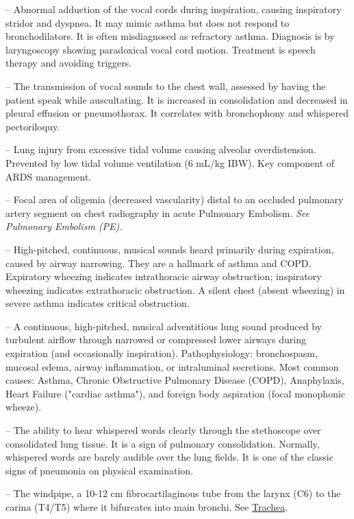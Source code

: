 -- Abnormal adduction of the vocal cords during inspiration, causing inspiratory stridor and dyspnea. It may mimic asthma but does not respond to bronchodilators. It is often misdiagnosed as refractory asthma. Diagnosis is by laryngoscopy showing paradoxical vocal cord motion. Treatment is speech therapy and avoiding triggers.

-- The transmission of vocal sounds to the chest wall, assessed by having the patient speak while auscultating. It is increased in consolidation and decreased in pleural effusion or pneumothorax. It correlates with bronchophony and whispered pectoriloquy.

-- Lung injury from excessive tidal volume causing alveolar overdistension. Prevented by low tidal volume ventilation (6 mL/kg IBW). Key component of ARDS management.

-- Focal area of oligemia (decreased vascularity) distal to an occluded pulmonary artery segment on chest radiography in acute Pulmonary Embolism. \textit{See Pulmonary Embolism (PE).}

-- High-pitched, continuous, musical sounds heard primarily during expiration, caused by airway narrowing. They are a hallmark of asthma and COPD. Expiratory wheezing indicates intrathoracic airway obstruction; inspiratory wheezing indicates extrathoracic obstruction. A silent chest (absent wheezing) in severe asthma indicates critical obstruction.

-- A continuous, high-pitched, musical adventitious lung sound produced by turbulent airflow through narrowed or compressed lower airways during expiration (and occasionally inspiration). Pathophysiology: bronchospasm, mucosal edema, airway inflammation, or intraluminal secretions. Most common causes: Asthma, Chronic Obstructive Pulmonary Disease (COPD), Anaphylaxis, Heart Failure ("cardiac asthma"), and foreign body aspiration (focal monophonic wheeze).

-- The ability to hear whispered words clearly through the stethoscope over consolidated lung tissue. It is a sign of pulmonary consolidation. Normally, whispered words are barely audible over the lung fields. It is one of the classic signs of pneumonia on physical examination.

-- The windpipe, a 10-12 cm fibrocartilaginous tube from the larynx (C6) to the carina (T4/T5) where it bifurcates into main bronchi. See \hyperlink{Trachea}{Trachea}.
